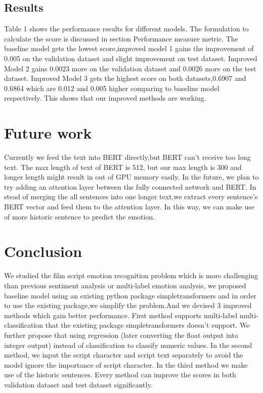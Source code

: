 \documentclass[12pt,twocolumn,letterpaper]{article}
\begin{document}
\subsection{Results}


Table 1 shows the performance results for different models. The formulation to calculate the score is discussed in section Performance measure metric. The baseline model gets the lowest score,improved model 1 gains the improvement of  0.005 on the validation dataset and slight improvement on test dataset. Improved Model 2 gains 0.0023 more on the validation dataset and 0.0026 more on the test dataset. Improved Model 3 gets the highest score on both datasets,0.6907 and 0.6864 which are 0.012 and 0.005 higher comparing to baseline model respectively. This shows that our improved methods are working. 




\section{Future work}
 Currently we feed the text into BERT directly,but BERT can't receive too long text. The max length of text of BERT is 512, but our max length is 300 and longer length might result in out of GPU memory easily.  In the future, we plan to try adding an attention layer between the fully connected network and BERT. In stead of merging the all sentences into one longer text,we extract every sentence's BERT vector and feed them to the attention layer.  In this way, we can make use of more historic sentence to predict the emotion.

\section{Conclusion}
We studied the film script emotion recognition problem which is more challenging than previous sentiment analysis or multi-label emotion analysis, we proposed baseline model using an existing python package simpletransformers and in order to use the existing package,we simplify the problem.And we devised 3 improved methods which gain better performance. First method supports multi-label multi-classification that the existing package simpletransformers doesn't support. We further propose that using regression (later converting the float output into integer output) instead of classification to classify numeric values. In the second method, we input the script character and script text separately to avoid the model ignore the importance of script character. In the third method we make use of the historic sentences. Every method can improve the scores in both validation dataset and test dataset significantly. 

  


{\small


}
\end{document}
